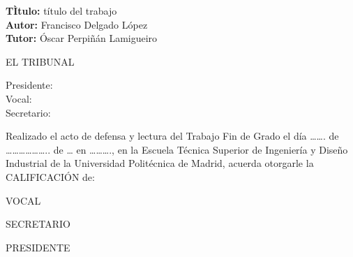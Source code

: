 \cleardoublepage

\begin{flushleft} \large
	\textbf{TÌtulo:} título del trabajo \\
	\textbf{Autor:} Francisco Delgado López\\
	\textbf{Tutor:} Óscar Perpiñán Lamigueiro \\ [1 cm]
	
\end{flushleft} 

\begin{center} \LARGE
	EL TRIBUNAL \\ [1 cm]
\end{center}

\begin{flushleft} \LARGE
	Presidente: \\ [1 cm]
	Vocal: \\ [1 cm]
	Secretario: \\ [1.5 cm]
\end{flushleft}

\large
Realizado el acto de defensa y lectura del Trabajo Fin de Grado el
día \ldots{}\ldots{}. de \ldots{}\ldots{}\ldots{}\ldots{}\ldots{}\ldots{}..   de \ldots{} en \ldots{}\ldots{}\ldots{}., en la Escuela
Técnica Superior de Ingeniería y Diseño Industrial de la Universidad Politécnica de
Madrid, acuerda otorgarle la CALIFICACIÓN de:
\\ [2 cm]

\begin{center}
	\large VOCAL \\ [2.2 cm]
\end{center}

\begin{minipage}{0.5\textwidth}
	\begin{flushleft}
		\large SECRETARIO
	\end{flushleft}
\end{minipage}
\begin{minipage}{0.5\textwidth}
	\begin{flushright}
		\large PRESIDENTE
	\end{flushright} 
\end{minipage}
